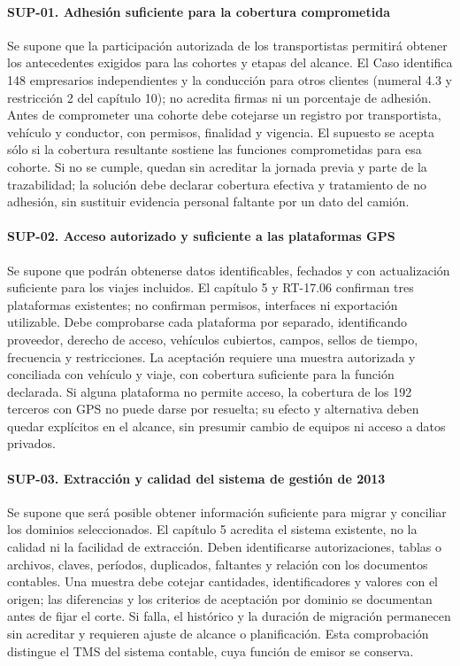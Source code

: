 \paragraph{SUP-01. Adhesión suficiente para la cobertura comprometida}
Se supone que la participación autorizada de los transportistas permitirá obtener los antecedentes exigidos para las cohortes y etapas del alcance. El Caso identifica 148 empresarios independientes y la conducción para otros clientes (numeral 4.3 y restricción 2 del capítulo 10); no acredita firmas ni un porcentaje de adhesión. Antes de comprometer una cohorte debe cotejarse un registro por transportista, vehículo y conductor, con permisos, finalidad y vigencia. El supuesto se acepta sólo si la cobertura resultante sostiene las funciones comprometidas para esa cohorte. Si no se cumple, quedan sin acreditar la jornada previa y parte de la trazabilidad; la solución debe declarar cobertura efectiva y tratamiento de no adhesión, sin sustituir evidencia personal faltante por un dato del camión.

\paragraph{SUP-02. Acceso autorizado y suficiente a las plataformas GPS}
Se supone que podrán obtenerse datos identificables, fechados y con actualización suficiente para los viajes incluidos. El capítulo 5 y RT-17.06 confirman tres plataformas existentes; no confirman permisos, interfaces ni exportación utilizable. Debe comprobarse cada plataforma por separado, identificando proveedor, derecho de acceso, vehículos cubiertos, campos, sellos de tiempo, frecuencia y restricciones. La aceptación requiere una muestra autorizada y conciliada con vehículo y viaje, con cobertura suficiente para la función declarada. Si alguna plataforma no permite acceso, la cobertura de los 192 terceros con GPS no puede darse por resuelta; su efecto y alternativa deben quedar explícitos en el alcance, sin presumir cambio de equipos ni acceso a datos privados.

\paragraph{SUP-03. Extracción y calidad del sistema de gestión de 2013}
Se supone que será posible obtener información suficiente para migrar y conciliar los dominios seleccionados. El capítulo 5 acredita el sistema existente, no la calidad ni la facilidad de extracción. Deben identificarse autorizaciones, tablas o archivos, claves, períodos, duplicados, faltantes y relación con los documentos contables. Una muestra debe cotejar cantidades, identificadores y valores con el origen; las diferencias y los criterios de aceptación por dominio se documentan antes de fijar el corte. Si falla, el histórico y la duración de migración permanecen sin acreditar y requieren ajuste de alcance o planificación. Esta comprobación distingue el TMS del sistema contable, cuya función de emisor se conserva.

